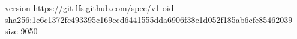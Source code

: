 version https://git-lfs.github.com/spec/v1
oid sha256:1e6c1372fc493395c169ecd6441555dda6906f38e1d052f185ab6cfe85462039
size 9050

